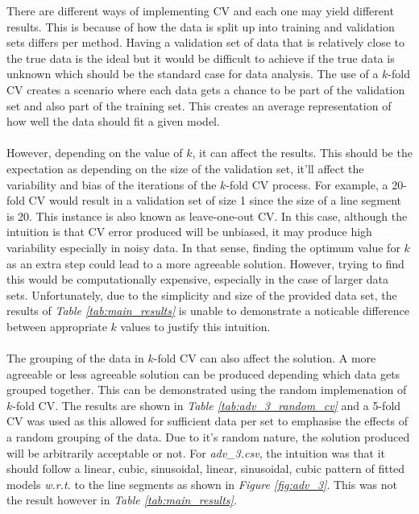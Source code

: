 \documentclass[a4paper,11pt]{article}
\begin{document}
\noindent
There are different ways of implementing CV and each one may yield different
results. This is because of how the data is split up into training and validation sets
differs per method. Having a validation set of data that is relatively close
to the true data is the ideal but it would be difficult to achieve if the true
data is unknown which should be the standard case for data analysis. The use of
a $k$-fold CV creates a scenario where each data gets a chance to be part of the
validation set and also part of the training set. This creates an average representation
of how well the data should fit a given model.
\\ \\
However, depending on the value of $k$, it can affect the results. This should be the
expectation as depending on the size of the validation set, it'll affect the
variability and bias of the iterations of the $k$-fold CV process. For example, a 20-fold
CV would result in a validation set of size 1 since the size of a line segment is 20.
This instance is also known as leave-one-out CV. In this case, although the intuition is that
CV error produced will be unbiased, it may produce high variability especially in noisy
data. In that sense, finding the optimum value for $k$ as an extra step could lead
to a more agreeable solution. However, trying to find this would be computationally
expensive, especially in the case of larger data sets. Unfortunately, due to
the simplicity and size of the provided data set, the results of
\textit{Table \ref{tab:main_results}} is unable to demonstrate a noticable
difference between appropriate $k$ values to justify this intuition.
\\ \\
The grouping of the data in $k$-fold CV can also affect the solution. A more
agreeable or less agreeable solution can be produced depending which data gets
grouped together. This can be demonstrated using the random implemenation of $k$-fold
CV. The results are shown in \textit{Table \ref{tab:adv_3_random_cv}} and a 5-fold
CV was used as this allowed for sufficient data per set to emphasise the effects of a random
grouping of the data. Due to it's random nature, the solution produced will be
arbitrarily acceptable or not. For \textit{adv\_3.csv}, the intuition was that it should
follow a linear, cubic, sinusoidal, linear, sinusoidal, cubic pattern of fitted models
\textit{w.r.t.} to the line segments as shown in \textit{Figure \ref{fig:adv_3}}.
This was not the result however in \textit{Table \ref{tab:main_results}}.
\end{document}
